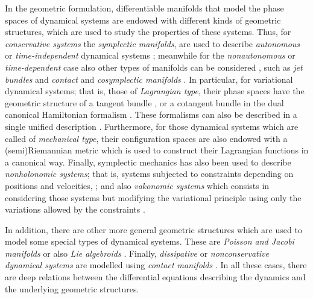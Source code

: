 \documentclass[12pt]{report}
\begin{document}
In the geometric formulation, 
differentiable manifolds that model the phase spaces of dynamical systems
are endowed with different kinds of geometric structures,
which are used to study the properties of these systems.
Thus, for {\sl conservative systems}
the {\sl symplectic manifolds}, are used to describe
{\sl autonomous} or {\sl time-independent} dynamical systems
\cite{AM-78,Ar-89,CDW-87,dLe89,Lewis,LM-sgam,Li-75,MR-99,MT-78,So-ssd,VK-75,VK-77,We-77};
meanwhile for the {\sl nonautonomous} or {\sl time-dependent} case
also other types of manifolds can be considered ,
such as {\sl jet bundles} and {\sl contact} and {\sl cosymplectic manifolds} 
\cite{AM-78,CLL-92,CLM-91,Cr-95,CPT-hctd,EMR-gstds,MS-98,MV-03,Saunders89}.
In particular, for variational dynamical systems; 
that is, those of {\sl Lagrangian type},
their phase spaces have the geometric structure of a
tangent bundle \cite{Cr-83b,CP-adg,Ga-52,Go-69,klein,Tu-74,Tu-76a}, 
or a cotangent bundle in the dual canonical Hamiltonian formalism
\cite{AM-78,Ar-89,CDW-87,LM-sgam,Tu-74,Tu-76b}.
These formalisms can also be described in a single unified description
\cite{SR-83,SR-83b}.
Furthermore, for those dynamical systems which are called of {\sl mechanical type}, their configuration spaces are also endowed 
with a (semi)Riemannian metric  \cite{AM-78,Ar-89,CC-2005,CDW-87,GN-2014,Ol-02}
which is used to construct their Lagrangian functions in a canonical way.
Finally, symplectic mechanics has also been  used to describe  {\sl nonholonomic systems};
that is, systems subjected to constraints depending on positions and velocities,
\cite{Ar-89,CLMM-2002,LMM,LM-96,Ga-70,Lewis2020,Neimark-Fufaev,Ve};
and also {\sl vakonomic systems}
which consists in considering those systems but modifying the variational principle
using only the variations allowed by the constraints
\cite{Ar-89,Bli,Els,MCL-2000}.

In addition, there are other more general geometric structures
which are used to model some special types of dynamical systems.
These are {\sl Poisson and Jacobi manifolds} \cite{LM-sgam,Marle-83} or also 
{\sl Lie algebroids} \cite{CNS-2007b,LMM-2005,GG-2006,GUG-2006,Edu-2001,MMS-2002,We-96}.
Finally, {\sl dissipative} or {\sl nonconservative dynamical systems} are modelled using {\sl contact manifolds}
\cite{Bravetti2017,BCT-2017,CIAGLIA2018,LGMMR-2020,DeLeon2019,
DeLeon2016b,GGMRR-2019b,KA-2013,LL-2018}.
In all these cases, there are deep relations between the differential equations 
describing the dynamics and the underlying geometric structures.
\end{document}
